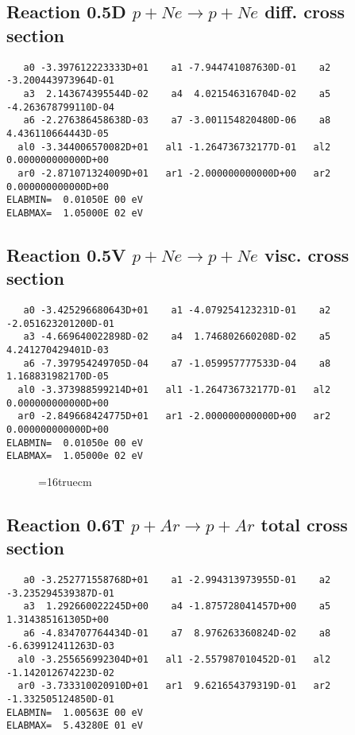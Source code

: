 \documentclass[12pt]{article}
\begin{document}
\subsection{
Reaction 0.5D    $p + Ne \rightarrow p + Ne  $ diff. cross
section }


\begin{small}\begin{verbatim}
   a0 -3.397612223333D+01    a1 -7.944741087630D-01    a2 -3.200443973964D-01
   a3  2.143674395544D-02    a4  4.021546316704D-02    a5 -4.263678799110D-04
   a6 -2.276386458638D-03    a7 -3.001154820480D-06    a8  4.436110664443D-05
  al0 -3.344006570082D+01   al1 -1.264736732177D-01   al2  0.000000000000D+00
  ar0 -2.871071324009D+01   ar1 -2.000000000000D+00   ar2  0.000000000000D+00
ELABMIN=  0.01050E 00 eV
ELABMAX=  1.05000E 02 eV
\end{verbatim}\end{small}


\subsection{
Reaction 0.5V   $ p + Ne \rightarrow p + Ne  $ visc. cross
section }


\begin{small}\begin{verbatim}
   a0 -3.425296680643D+01    a1 -4.079254123231D-01    a2 -2.051623201200D-01
   a3 -4.669640022898D-02    a4  1.746802660208D-02    a5  4.241270429401D-03
   a6 -7.397954249705D-04    a7 -1.059957777533D-04    a8  1.168831982170D-05
  al0 -3.373988599214D+01   al1 -1.264736732177D-01   al2  0.000000000000D+00
  ar0 -2.849668424775D+01   ar1 -2.000000000000D+00   ar2  0.000000000000D+00
ELABMIN=  0.01050e 00 eV
ELABMAX=  1.05000e 02 eV
\end{verbatim}\end{small}



\begin{figure} \label{0.5}
\epsfxsize=16truecm
\end{figure}
\newpage



\subsection{
Reaction 0.6T   $ p + Ar \rightarrow p + Ar $ total cross
section }



\begin{small}\begin{verbatim}
   a0 -3.252771558768D+01    a1 -2.994313973955D-01    a2 -3.235294539387D-01
   a3  1.292660022245D+00    a4 -1.875728041457D+00    a5  1.314385161305D+00
   a6 -4.834707764434D-01    a7  8.976263360824D-02    a8 -6.639912411263D-03
  al0 -3.255656992304D+01   al1 -2.557987010452D-01   al2 -1.142012674223D-02
  ar0 -3.733310020910D+01   ar1  9.621654379319D-01   ar2 -1.332505124850D-01
ELABMIN=  1.00563E 00 eV
ELABMAX=  5.43280E 01 eV
\end{verbatim}\end{small}
\end{document}
